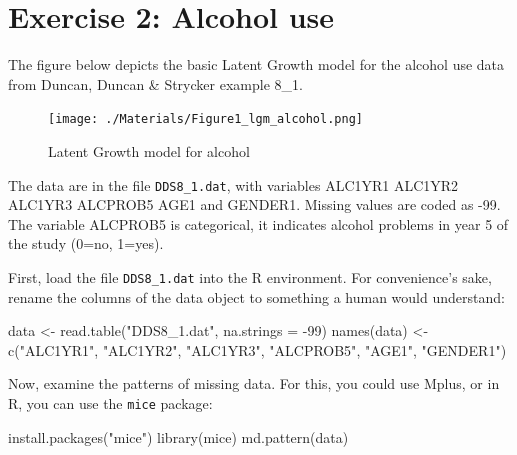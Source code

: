 \documentclass[
]{book}
\newenvironment{Shaded}{\begin{snugshade}}{\end{snugshade}}
\newcommand{\AttributeTok}[1]{\textcolor[rgb]{0.77,0.63,0.00}{#1}}
\newcommand{\DecValTok}[1]{\textcolor[rgb]{0.00,0.00,0.81}{#1}}
\newcommand{\FunctionTok}[1]{\textcolor[rgb]{0.00,0.00,0.00}{#1}}
\newcommand{\NormalTok}[1]{#1}
\newcommand{\OtherTok}[1]{\textcolor[rgb]{0.56,0.35,0.01}{#1}}
\newcommand{\SpecialCharTok}[1]{\textcolor[rgb]{0.00,0.00,0.00}{#1}}
\newcommand{\StringTok}[1]{\textcolor[rgb]{0.31,0.60,0.02}{#1}}
\begin{document}
\hypertarget{exercise-2-alcohol-use}{%
\section{Exercise 2: Alcohol use}\label{exercise-2-alcohol-use}}

The figure below depicts the basic Latent Growth model for the alcohol use data from Duncan, Duncan \& Strycker example 8\_1.

\begin{figure}
\centering
\texttt{[image: ./Materials/Figure1\_lgm\_alcohol.png]}
\caption{Latent Growth model for alcohol}
\end{figure}

The data are in the file \texttt{DDS8\_1.dat}, with variables ALC1YR1 ALC1YR2 ALC1YR3 ALCPROB5 AGE1 and
GENDER1. Missing values are coded as -99. The variable ALCPROB5 is categorical, it indicates alcohol problems in
year 5 of the study (0=no, 1=yes).

First, load the file \texttt{DDS8\_1.dat} into the R environment. For convenience's sake, rename the columns of the data object to something a human would understand:

\begin{Shaded}
\begin{Highlighting}[]
\NormalTok{data }\OtherTok{\textless{}{-}} \FunctionTok{read.table}\NormalTok{(}\StringTok{"DDS8\_1.dat"}\NormalTok{, }\AttributeTok{na.strings =} \SpecialCharTok{{-}}\DecValTok{99}\NormalTok{)}
\FunctionTok{names}\NormalTok{(data) }\OtherTok{\textless{}{-}} \FunctionTok{c}\NormalTok{(}\StringTok{"ALC1YR1"}\NormalTok{, }\StringTok{"ALC1YR2"}\NormalTok{, }\StringTok{"ALC1YR3"}\NormalTok{,}
                 \StringTok{"ALCPROB5"}\NormalTok{, }\StringTok{"AGE1"}\NormalTok{, }\StringTok{"GENDER1"}\NormalTok{)}
\end{Highlighting}
\end{Shaded}

Now, examine the patterns of missing data. For this, you could use Mplus,
or in R, you can use the \texttt{mice} package:

\begin{Shaded}
\begin{Highlighting}[]
\FunctionTok{install.packages}\NormalTok{(}\StringTok{"mice"}\NormalTok{)}
\FunctionTok{library}\NormalTok{(mice)}
\FunctionTok{md.pattern}\NormalTok{(data)}
\end{Highlighting}
\end{Shaded}
\end{document}
